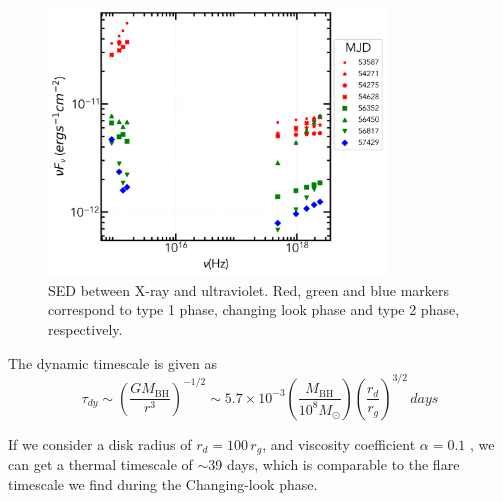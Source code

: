 \begin{figure}
\centering
	\includegraphics[width=0.8\textwidth]{./pic/Mrk1018_sed.png}
    \caption{SED between X-ray and ultraviolet. Red, green and blue markers correspond to type 1 phase, changing look phase and type 2 phase, respectively. }
    \label{fig:xray-uvot-sed}
\end{figure}




The dynamic timescale is given as 
\begin{equation}
\tau_{dy} \sim (\frac{G M_\mathrm{BH}}{r^3})^{-1/2} \sim 5.7\times 10^{-3} (\frac{M_\mathrm{BH}}{10^8M_{\odot}})(\frac{r_d}{r_g})^{3/2} \, days
\end{equation} 

If we consider a disk radius of $r_d =100\, r_g$, and viscosity coefficient $\alpha=0.1$ , we can get a thermal timescale of $\sim$39 days, which is comparable to the flare timescale we find during the Changing-look phase.




